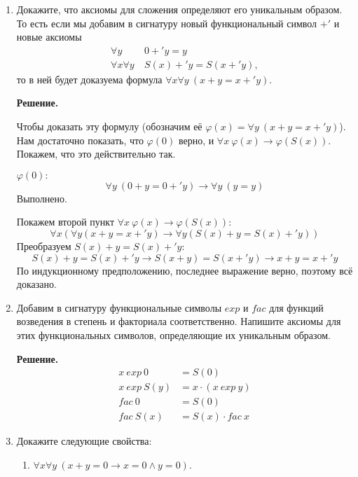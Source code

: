 \begin{enumerate}
\begin{itemize}
	
\end{itemize}

\item Докажите, что аксиомы для сложения определяют его уникальным образом.
    То есть если мы добавим в сигнатуру новый функциональный символ $+'$ и новые аксиомы
\begin{align*}
\forall y\ & 0 +' y = y \tag{$+'0$} \\
\forall x \forall y\ & S(x) +' y = S(x +' y) \tag{$+'S$},
\end{align*}
то в ней будет доказуема формула $\forall x \forall y\ (x + y = x +' y)$.

\textbf{Решение.} 

Чтобы доказать эту формулу (обозначим её $\varphi(x) = \forall y\ (x + y = x +' y)$). Нам достаточно показать, 
что $\varphi(0)$ верно, и $\forall x \ \varphi(x) \to \varphi(S(x))$. Покажем, что это действительно так.

$\varphi(0):$ 
\begin{equation*}
	\forall y \ (0 + y = 0 +' y) \to \forall y \ (y = y)
\end{equation*}
Выполнено.

Покажем второй пункт  $\forall x \ \varphi(x) \to \varphi(S(x))$:
\begin{equation*}
	\forall x (\forall y (x + y = x +' y) \to \forall y (S(x) + y = S(x) +' y))
\end{equation*}
Преобразуем $S(x) + y = S(x) +' y$:
\begin{equation*}
	S(x) + y = S(x) +' y \to S(x + y) = S(x +' y) \to x + y = x +' y
\end{equation*}
По индукционному предположению, последнее выражение верно, поэтому всё доказано.

\item Добавим в сигнатуру функциональные символы $exp$ и $fac$ для функций возведения в степень и факториала
соответственно.
    Напишите аксиомы для этих функциональных символов, определяющие их уникальным образом.

	\textbf{Решение.}
	\begin{align*}
		x \ exp \ 0 &= S(0)\\
		x \ exp \ S(y) &= x \cdot (x \ exp\ y) \\ 
		fac \ 0 &= S(0) \\
		fac \ S(x) &= S(x) \cdot fac\ x
	\end{align*}

\item Докажите следующие свойства:
\begin{enumerate}
\item $\forall x \forall y\ (x + y = 0 \to x = 0 \land y = 0)$.


\end{enumerate}
\end{enumerate}
